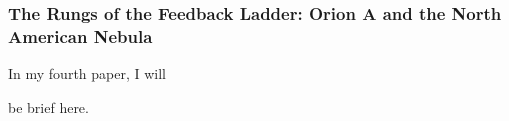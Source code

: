 \subsubsection{The Rungs of the Feedback Ladder: Orion A and the North American Nebula}\label{sec:paper4}
        In my fourth paper, I will 
        
        be brief here.